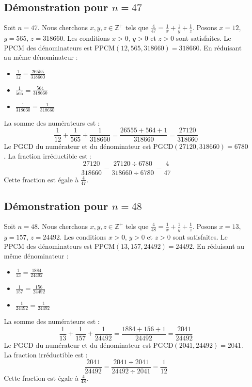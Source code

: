 \documentclass[11pt,a4paper]{article}
\begin{document}
\subsection{Démonstration pour $n = 47$}
Soit $n = 47$. Nous cherchons $x, y, z \in \mathbb{Z}^{+}$ tels que $\frac{4}{47} = \frac{1}{x} + \frac{1}{y} + \frac{1}{z}$.
Posons $x = 12$, $y = 565$, $z = 318660$.
Les conditions $x > 0$, $y > 0$ et $z > 0$ sont satisfaites.
Le PPCM des dénominateurs est $\text{PPCM}(12, 565, 318660) = 318660$.
En réduisant au même dénominateur :
\begin{itemize}
    \item $\frac{1}{12} = \frac{26555}{318660}$
    \item $\frac{1}{565} = \frac{564}{318660}$
    \item $\frac{1}{318660} = \frac{1}{318660}$
\end{itemize}
La somme des numérateurs est :
$$ \frac{1}{12} + \frac{1}{565} + \frac{1}{318660} = \frac{26555 + 564 + 1}{318660} = \frac{27120}{318660} $$
Le PGCD du numérateur et du dénominateur est $\text{PGCD}(27120, 318660) = 6780$.
La fraction irréductible est :
$$ \frac{27120}{318660} = \frac{27120 \div 6780}{318660 \div 6780} = \frac{4}{47} $$
Cette fraction est égale à $\frac{4}{47}$.

\subsection{Démonstration pour $n = 48$}
Soit $n = 48$. Nous cherchons $x, y, z \in \mathbb{Z}^{+}$ tels que $\frac{4}{48} = \frac{1}{x} + \frac{1}{y} + \frac{1}{z}$.
Posons $x = 13$, $y = 157$, $z = 24492$.
Les conditions $x > 0$, $y > 0$ et $z > 0$ sont satisfaites.
Le PPCM des dénominateurs est $\text{PPCM}(13, 157, 24492) = 24492$.
En réduisant au même dénominateur :
\begin{itemize}
    \item $\frac{1}{13} = \frac{1884}{24492}$
    \item $\frac{1}{157} = \frac{156}{24492}$
    \item $\frac{1}{24492} = \frac{1}{24492}$
\end{itemize}
La somme des numérateurs est :
$$ \frac{1}{13} + \frac{1}{157} + \frac{1}{24492} = \frac{1884 + 156 + 1}{24492} = \frac{2041}{24492} $$
Le PGCD du numérateur et du dénominateur est $\text{PGCD}(2041, 24492) = 2041$.
La fraction irréductible est :
$$ \frac{2041}{24492} = \frac{2041 \div 2041}{24492 \div 2041} = \frac{1}{12} $$
Cette fraction est égale à $\frac{4}{48}$.
\end{document}
